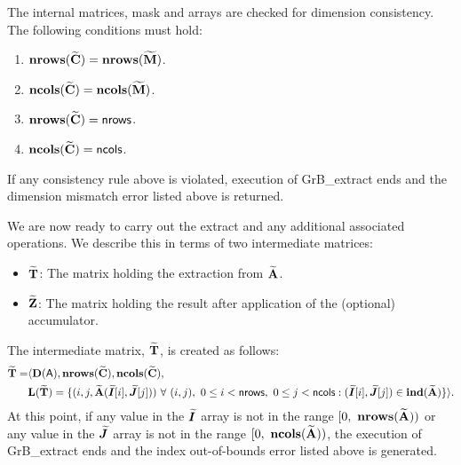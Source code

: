 The internal matrices, mask and arrays are checked for dimension consistency. 
The following conditions must hold:
\begin{enumerate}
	\item $\bold{nrows}({\bf \widetilde{C}}) = \bold{nrows}({\bf \widetilde{M}})$.

	\item $\bold{ncols}({\bf \widetilde{C}}) = \bold{ncols}({\bf \widetilde{M}})$.

	\item $\bold{nrows}({\bf \widetilde{C}}) = {\sf nrows}$.

	\item $\bold{ncols}({\bf \widetilde{C}}) = {\sf ncols}$.
\end{enumerate}
If any consistency rule above is violated, execution of {\sf GrB\_extract} ends 
and the dimension mismatch error listed above is returned.

We are now ready to carry out the extract and any additional 
associated operations.  We describe this in terms of two intermediate matrices:
\begin{itemize}
    \item ${\bf \widetilde{T}}$: The matrix holding the extraction from 
    ${\bf \widetilde{A}}$.
    
    \item ${\bf \widetilde{Z}}$: The matrix holding the result after 
    application of the (optional) accumulator.
\end{itemize}

The intermediate matrix, ${\bf \widetilde{T}}$, is created as follows:
\[
\begin{aligned}
{\bf \widetilde{T}} = & \langle \bold{D}({\sf A}),
                           \bold{nrows}({\bf \widetilde{C}}), 
                           \bold{ncols}({\bf \widetilde{C}}),  \\
                         & \bold{L}({\bf \widetilde{T}}) =
\{(i,j,{\bf \widetilde{A}}(\bm{\widetilde{I}}[i],\bm{\widetilde{J}}[j])) 
\ \forall \ (i,j), \ 0 \leq i < {\sf nrows}, \ 0 \leq j < {\sf ncols} :
(\bm{\widetilde{I}}[i], \bm{\widetilde{J}}[j]) \in 
\bold{ind}({\bf \widetilde{A}}) \} \rangle.
\end{aligned}
\]
At this point, if any value in the $\bm{\widetilde{I}}$ array is not in
the range $[0,\ \bold{nrows}(\matrix{\widetilde{A}}) )$ or any value in the 
$\bm{\widetilde{J}}$ array is not in the range 
$[0,\ \bold{ncols}(\matrix{\widetilde{A}}))$, the execution of {\sf GrB\_extract} 
ends and the index out-of-bounds error listed above is generated.  

